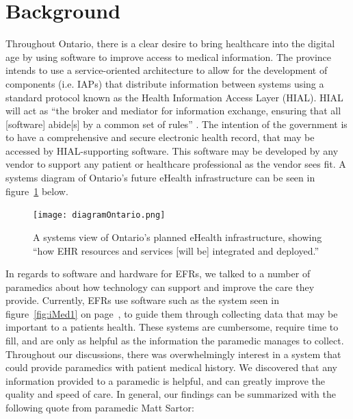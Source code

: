 
\section{Background}

Throughout Ontario, there is a clear desire to bring healthcare into the digital age by using software to improve access to medical information. The province intends to use a service-oriented architecture to allow for the development of components (i.e. IAPs) that distribute information between systems using a standard protocol known as the Health Information Access Layer (HIAL). HIAL will act as ``the broker and mediator for information exchange, ensuring that all [software] abide[s] by a common set of rules'' \cite{b1}. The intention of the government is to have a comprehensive and secure electronic health record, that may be accessed by HIAL-supporting software. This software may be developed by any vendor to support any patient or healthcare professional as the vendor sees fit. A systems diagram of Ontario's future eHealth infrastructure can be seen in figure~\ref{fig:eHealth1} below.

\begin{figure}[h]
  \centering
  \texttt{[image: diagramOntario.png]}
  \captionsetup{format=hang}
  \caption[Ontario eHealth Systems View]{A systems view of Ontario's planned eHealth infrastructure, showing ``how EHR resources and services [will be] integrated and deployed.'' \cite{b1}}
  \label{fig:eHealth1}
\end{figure}

In regards to software and hardware for EFRs, we talked to a number of paramedics about how technology can support and improve the care they provide. Currently, EFRs use software such as the system seen in figure~\ref{fig:iMed1} on page~\pageref{fig:iMed1}, to guide them through collecting data that may be important to a patients health. These systems are cumbersome, require time to fill, and are only as helpful as the information the paramedic manages to collect. Throughout our discussions, there was overwhelmingly interest in a system that could provide paramedics with patient medical history. We discovered that any information provided to a paramedic is helpful, and can greatly improve the quality and speed of care. In general, our findings can be summarized with the following quote from paramedic Matt Sartor:

